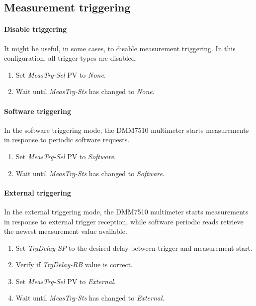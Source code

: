 \documentclass[openany]{article}
\begin{document}
	\bigskip
	\noindent{}

	\subsection{Measurement triggering}

		\paragraph{Disable triggering}\label{disable-triggering} It might be useful, in some cases, to disable measurement triggering. In this configuration, all trigger types are disabled.

			\begin{enumerate}
				\item Set \emph{MeasTrg-Sel} PV to \emph{None}.
				\item Wait until \emph{MeasTrg-Sts} has changed to \emph{None}.
			\end{enumerate}

		\paragraph{Software triggering} In the software triggering mode, the DMM7510 multimeter starts measurements in response to periodic software requests.

			\begin{enumerate}
				\item Set \emph{MeasTrg-Sel} PV to \emph{Software}.
				\item Wait until \emph{MeasTrg-Sts} has changed to \emph{Software}.
			\end{enumerate}

		\paragraph{External triggering} In the external triggering mode, the DMM7510 multimeter starts measurements in response to external trigger reception, while software periodic reads retrieve the newest measurement value available.

			\begin{enumerate}
				\item Set \emph{TrgDelay-SP} to the desired delay between trigger and measurement start.
				\item Verify if \emph{TrgDelay-RB} value is correct.
				\item Set \emph{MeasTrg-Sel} PV to \emph{External}.
				\item Wait until \emph{MeasTrg-Sts} has changed to \emph{External}.
			\end{enumerate}
\end{document}
